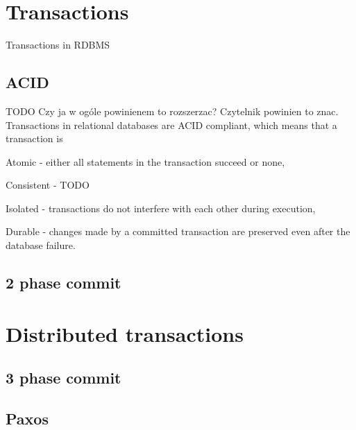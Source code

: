 \section{Transactions}\label{sec:theory:transactions}
Transactions in RDBMS

\subsection{ACID}
TODO Czy ja w ogóle powinienem to rozszerzac? Czytelnik powinien to znac.
Transactions in relational databases are ACID compliant, which means that a transaction is \begin{enumerate*} 
\item Atomic - either all statements in the transaction succeed or none,
\item Consistent - TODO
\item Isolated - transactions do not interfere with each other during execution,
\item Durable - changes made by a committed transaction are preserved even after the database failure.
\end{enumerate*}

\subsection{2 phase commit}

\section{Distributed transactions}


\subsection{3 phase commit}\label{sec:theory:transactions:3pc}

\subsection{Paxos}


